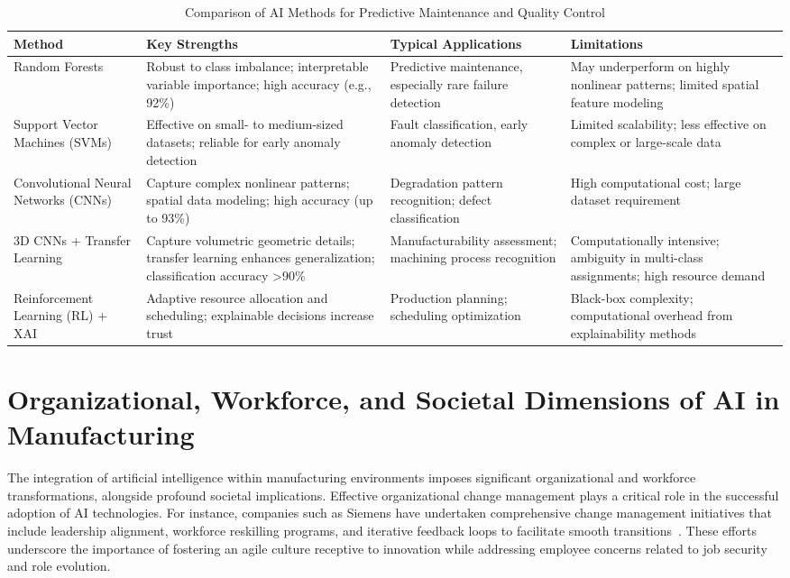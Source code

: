 \documentclass[sigconf]{acmart}
\begin{document}
\begin{table*}[htbp]
\centering
\caption{Comparison of AI Methods for Predictive Maintenance and Quality Control}
\label{tab:method_comparison}
\begin{adjustbox}{max width=\textwidth}
\begin{tabular}{@{}llll@{}}
\toprule
\textbf{Method} & \textbf{Key Strengths} & \textbf{Typical Applications} & \textbf{Limitations} \\
\toprule
Random Forests & Robust to class imbalance; interpretable variable importance; high accuracy (e.g., 92\%) & Predictive maintenance, especially rare failure detection & May underperform on highly nonlinear patterns; limited spatial feature modeling \\
Support Vector Machines (SVMs) & Effective on small- to medium-sized datasets; reliable for early anomaly detection & Fault classification, early anomaly detection & Limited scalability; less effective on complex or large-scale data \\
Convolutional Neural Networks (CNNs) & Capture complex nonlinear patterns; spatial data modeling; high accuracy (up to 93\%) & Degradation pattern recognition; defect classification & High computational cost; large dataset requirement \\
3D CNNs + Transfer Learning & Capture volumetric geometric details; transfer learning enhances generalization; classification accuracy >90\% & Manufacturability assessment; machining process recognition & Computationally intensive; ambiguity in multi-class assignments; high resource demand \\
Reinforcement Learning (RL) + XAI & Adaptive resource allocation and scheduling; explainable decisions increase trust & Production planning; scheduling optimization & Black-box complexity; computational overhead from explainability methods \\
\bottomrule
\end{tabular}
\end{adjustbox}
\end{table*}

\section{Organizational, Workforce, and Societal Dimensions of AI in Manufacturing}

The integration of artificial intelligence within manufacturing environments imposes significant organizational and workforce transformations, alongside profound societal implications. Effective organizational change management plays a critical role in the successful adoption of AI technologies. For instance, companies such as Siemens have undertaken comprehensive change management initiatives that include leadership alignment, workforce reskilling programs, and iterative feedback loops to facilitate smooth transitions~\cite{}. These efforts underscore the importance of fostering an agile culture receptive to innovation while addressing employee concerns related to job security and role evolution.
\end{document}
